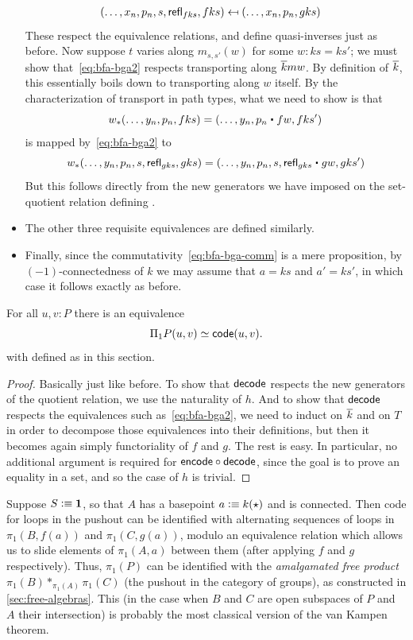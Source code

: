 \begin{itemize}
\begin{align*}
    (\dots, x_n, p_n, s, \mathsf{refl}_{fks}, fks) &\mapsfrom (\dots, x_n, p_n, gks)
  \end{align*}
  These respect the equivalence relations, and define quasi-inverses just as before.
  Now suppose $t$ varies along $m_{s,s'}(w)$ for some $w:ks=ks'$; we must show that~\eqref{eq:bfa-bga2} respects transporting along $\overline{k} mw$.
  By definition of $\overline{k}$, this essentially boils down to transporting along $w$ itself.
  By the characterization of transport in path types, what we need to show is that
  \[ w_*(\dots, y_n, p_n,fks) = (\dots,y_n, p_n \ct fw, fks') \]
  is mapped by~\eqref{eq:bfa-bga2} to
  \[ w_*(\dots,y_n,p_n,s,\refl{gks},gks) = (\dots, y_n, p_n, s, \refl{gks} \ct gw, gks') \]
  But this follows directly from the new generators we have imposed on the set-quotient relation defining \code.
\item The other three requisite equivalences are defined similarly.
\item Finally, since the commutativity~\eqref{eq:bfa-bga-comm} is a mere proposition, by $(-1)$-connectedness of $k$ we may assume that $a=ks$ and $a'=ks'$, in which case it follows exactly as before.
\end{itemize}

\begin{thm}
  For all $u,v:P$ there is an equivalence
  \[ \Pi_1P(u,v) \simeq \mathsf{code}(u,v). \]
  with \code defined as in this section.
\end{thm}

\begin{proof}
  Basically just like before.
  To show that $\mathsf{decode}$ respects the new generators of the quotient relation, we use the naturality of $h$.
  And to show that $\mathsf{decode}$ respects the equivalences such as~\eqref{eq:bfa-bga2}, we need to induct on $\overline{k}$ and on $T$ in order to decompose those equivalences into their definitions, but then it becomes again simply functoriality of $f$ and $g$.
  The rest is easy.
  In particular, no additional argument is required for $\mathsf{encode}\circ\mathsf{decode}$, since the goal is to prove an equality in a set, and so the case of $h$ is trivial.
\end{proof}

\begin{eg}\label{eg:clvk}
  Suppose $S\vcentcolon\equiv \mathbf{1}$, so that $A$ has a basepoint $a \vcentcolon\equiv k(\star)$ and is connected.
  Then code for loops in the pushout can be identified with alternating sequences of loops in $\pi_1(B,f(a))$ and $\pi_1(C,g(a))$, modulo an equivalence relation which allows us to slide elements of $\pi_1(A,a)$ between them (after applying $f$ and $g$ respectively).
  Thus, $\pi_1(P)$ can be identified with the \emph{amalgamated free product} $\pi_1(B) *_{\pi_1(A)} \pi_1(C)$ (the pushout in the category of groups), as constructed in \autoref{sec:free-algebras}.
  This (in the case when $B$ and $C$ are open subspaces of $P$ and $A$ their intersection) is probably the most classical version of the van Kampen theorem.
\end{eg}


